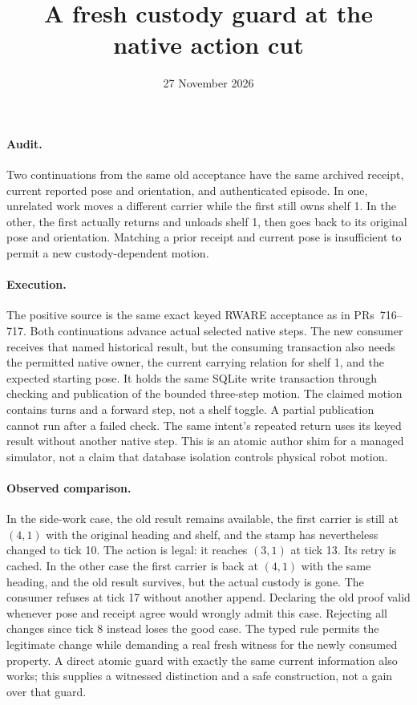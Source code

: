 \documentclass[11pt]{article}
\title{A fresh custody guard at the native action cut}
\date{27 November 2026}
\begin{document}
\maketitle
\paragraph{Audit.}
Two continuations from the same old acceptance have the
same archived receipt, current reported pose and orientation,
and authenticated episode. In one, unrelated work moves a
different carrier while the first still owns shelf 1. In the
other, the first actually returns and unloads shelf 1, then
goes back to its original pose and orientation. Matching a
prior receipt and current pose is insufficient to permit a
new custody-dependent motion.

\paragraph{Execution.}
The positive source is the same exact keyed RWARE acceptance
as in PRs~716--717. Both continuations advance actual selected
native steps. The new consumer receives that named historical
result, but the consuming transaction also needs the permitted
native owner, the current carrying relation for shelf 1, and
the expected starting pose. It holds the same SQLite write
transaction through checking and publication of the bounded
three-step motion. The claimed motion contains turns and a
forward step, not a shelf toggle. A partial publication cannot
run after a failed check. The same intent's repeated return
uses its keyed result without another native step. This is an
atomic author shim for a managed simulator, not a claim that
database isolation controls physical robot motion.

\paragraph{Observed comparison.}
In the side-work case, the old result remains available,
the first carrier is still at \((4,1)\) with the original
heading and shelf, and the stamp has nevertheless changed
to tick 10. The action is legal: it reaches \((3,1)\) at
tick 13. Its retry is cached.
In the other case the first carrier is back at \((4,1)\)
with the same heading, and the old result survives, but
the actual custody is gone. The consumer refuses at tick
17 without another append. Declaring the old proof valid
whenever pose and receipt agree would wrongly admit this case.
Rejecting all changes since tick 8 instead loses the good
case. The typed rule permits the legitimate change while
demanding a real fresh witness for the newly consumed property.
A direct atomic guard with exactly the same current information
also works; this supplies a witnessed distinction and a safe
construction, not a gain over that guard.
\end{document}
